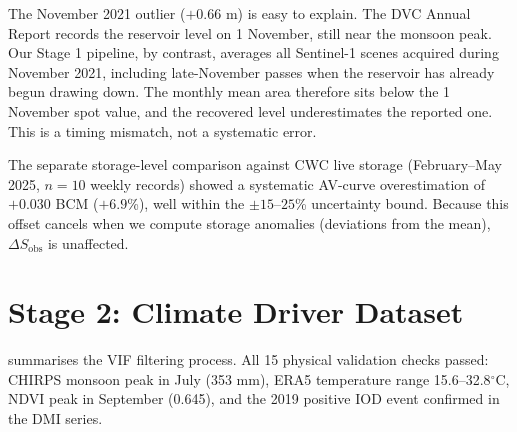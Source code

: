 \documentclass[12pt,a4paper,oneside]{report}
\newcommand{\dSobs}{\Delta S_{\mathrm{obs}}}
\begin{document}
The November 2021 outlier ($+0.66$ m) is easy to explain. The DVC
Annual Report records the reservoir level on 1 November, still near the
monsoon peak. Our Stage 1 pipeline, by contrast, averages all Sentinel-1
scenes acquired during November 2021, including late-November passes when
the reservoir has already begun drawing down. The monthly mean area therefore
sits below the 1 November spot value, and the recovered level underestimates
the reported one. This is a timing mismatch, not a systematic error.

The separate storage-level comparison against CWC live storage
(February--May 2025, $n = 10$ weekly records) showed a systematic AV-curve
overestimation of $+0.030$ BCM ($+6.9$\%), well within the $\pm 15$--$25$\%
uncertainty bound. Because this offset cancels when we compute storage
anomalies (deviations from the mean), $\dSobs$ is unaffected.

\section{Stage 2: Climate Driver Dataset}

 summarises the VIF filtering process. All 15
physical validation checks passed: CHIRPS monsoon peak in July (353 mm),
ERA5 temperature range 15.6--32.8$^\circ$C, NDVI peak in September (0.645),
and the 2019 positive IOD event confirmed in the DMI series.
\end{document}
